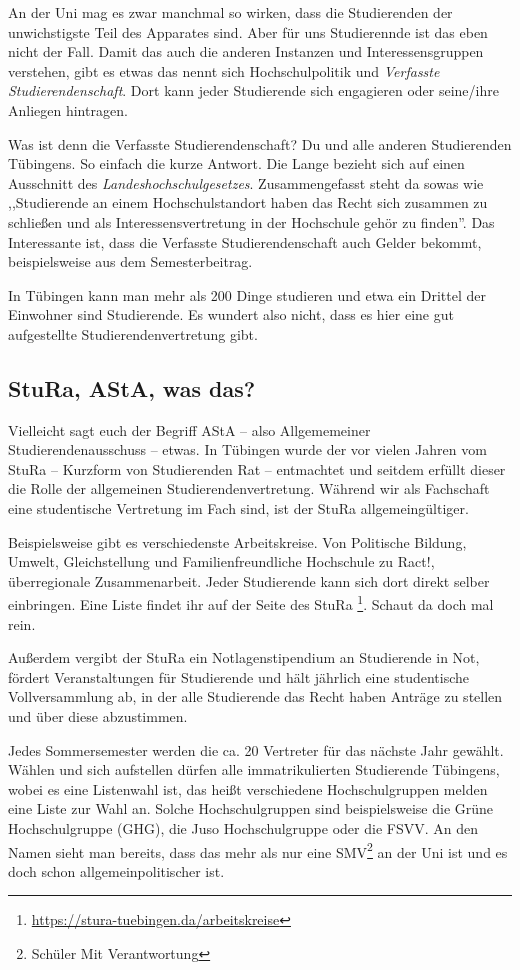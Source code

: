 An der Uni mag es zwar manchmal so wirken, dass die Studierenden der unwichstigste
Teil des Apparates sind.
Aber für uns Studierennde ist das eben nicht der Fall.
Damit das auch die anderen Instanzen und Interessensgruppen verstehen, gibt es
etwas das nennt sich Hochschulpolitik und \textit{Verfasste
Studierendenschaft}. Dort kann jeder Studierende sich engagieren oder seine/ihre
Anliegen hintragen.

Was ist denn die Verfasste Studierendenschaft? Du und alle anderen Studierenden
Tübingens. So einfach die kurze Antwort. Die Lange bezieht sich auf einen
Ausschnitt des \textit{Landeshochschulgesetzes}.  Zusammengefasst steht da
sowas wie ,,Studierende an einem Hochschulstandort haben das Recht sich zusammen
zu schließen und als Interessensvertretung in der Hochschule gehör zu finden''.
Das Interessante ist, dass die Verfasste Studierendenschaft auch Gelder bekommt,
beispielsweise aus dem Semesterbeitrag.

In Tübingen kann man mehr als 200 Dinge studieren und etwa ein Drittel der
Einwohner sind Studierende. Es wundert also nicht, dass es hier eine
gut aufgestellte Studierendenvertretung gibt.


\subsection{StuRa, AStA, was das?}

Vielleicht sagt euch der Begriff AStA -- also Allgememeiner
Studierendenausschuss -- etwas. In Tübingen wurde der vor vielen Jahren vom
StuRa -- Kurzform von Studierenden Rat -- entmachtet und seitdem erfüllt dieser
die Rolle der allgemeinen Studierendenvertretung. Während wir als Fachschaft
eine studentische Vertretung im Fach sind, ist der StuRa allgemeingültiger.

Beispielsweise gibt es verschiedenste Arbeitskreise. Von Politische Bildung,
Umwelt, Gleichstellung und Familienfreundliche Hochschule zu Ract!, überregionale
Zusammenarbeit. Jeder Studierende kann sich dort direkt selber einbringen.
Eine Liste findet ihr auf der Seite des StuRa
\footnote{\url{https://stura-tuebingen.da/arbeitskreise}}. Schaut da doch mal
rein.

Außerdem vergibt der StuRa ein Notlagenstipendium an Studierende in Not, fördert
Veranstaltungen für Studierende und hält jährlich eine studentische Vollversammlung
ab, in der alle Studierende das Recht haben Anträge zu stellen und über diese abzustimmen.

Jedes Sommersemester werden die ca. 20 Vertreter für das nächste Jahr gewählt.
Wählen und sich aufstellen dürfen alle immatrikulierten Studierende Tübingens,
wobei es eine Listenwahl ist, das heißt verschiedene
Hochschulgruppen melden eine Liste zur Wahl an. Solche Hochschulgruppen
sind beispielsweise die Grüne Hochschulgruppe (GHG), die Juso Hochschulgruppe
oder die FSVV. An den Namen sieht man bereits, dass das mehr als nur eine
SMV\footnote{Schüler Mit Verantwortung} an der Uni ist und es doch schon
allgemeinpolitischer ist.

